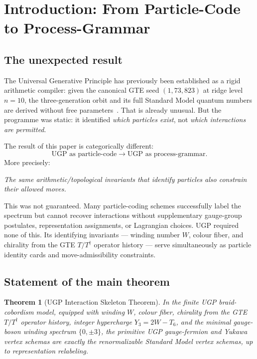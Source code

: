 \documentclass[12pt]{article}
\newtheorem{theorem}{Theorem}[section]
\theoremstyle{remark}
\newcommand{\YY}{Y_3}
\newcommand{\TT}{T_6}
\begin{document}
\section[Introduction]{Introduction: From Particle-Code to Process-Grammar}
\label{sec:intro}

\subsection{The unexpected result}

The Universal Generative Principle has previously been established as a
rigid arithmetic compiler: given the canonical GTE seed $(1, 73, 823)$ at
ridge level $n = 10$, the three-generation orbit and its full Standard Model
quantum numbers are derived without free parameters~\cite{ugp-p01}.  That is
already unusual.  But the programme was static: it identified \emph{which
particles exist}, not \emph{which interactions are permitted}.

The result of this paper is categorically different:
\begin{equation}
  \text{UGP as particle-code}
  \;\longrightarrow\;
  \text{UGP as process-grammar.}
\end{equation}
More precisely:
\begin{tcolorbox}[colback=gray!8,colframe=black!60,
  title=\textbf{Central discovery}]
\emph{The same arithmetic/topological invariants that identify particles also
constrain their allowed moves.}
\end{tcolorbox}

This was not guaranteed.  Many particle-coding schemes successfully label the
spectrum but cannot recover interactions without supplementary gauge-group
postulates, representation assignments, or Lagrangian choices.  UGP required
none of this.  Its identifying invariants --- winding number $W$, colour fiber,
and chirality from the GTE $T/T^\dagger$ operator history --- serve
simultaneously as particle identity cards and move-admissibility constraints.

\subsection{Statement of the main theorem}

\begin{theorem}[UGP Interaction Skeleton Theorem]
\label{thm:main}
In the finite UGP braid-cobordism model, equipped with winding $W$, colour
fiber, chirality from the GTE $T/T^\dagger$ operator history, integer
hypercharge $\YY = 2W - \TT$, and the minimal gauge-boson winding spectrum
$\{0, \pm 3\}$, the primitive UGP gauge-fermion and Yukawa vertex schemas are
exactly the renormalizable Standard Model vertex schemas, up to representation
relabeling.
\end{theorem}
\end{document}
